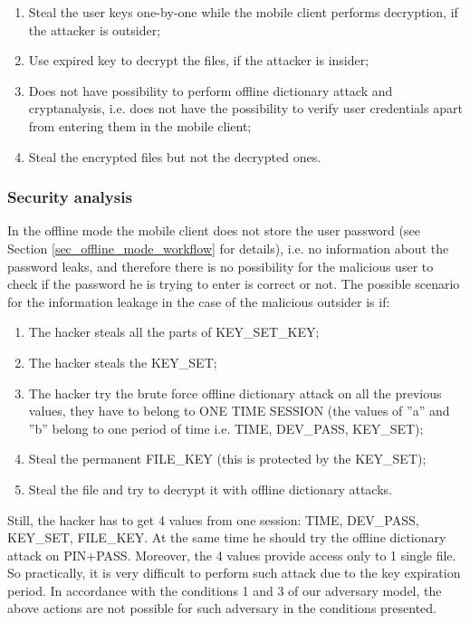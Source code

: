 \documentclass[twocolumn]{svjour3}          	%
\begin{document}
\begin{enumerate}
	\item Steal the user keys one-by-one while the mobile client performs decryption, if the attacker is outsider;
	\item Use expired key to decrypt the files, if the attacker is insider;
	\item Does not have possibility to perform offline dictionary attack and cryptanalysis, i.e. does not have the possibility to verify user credentials apart from entering them in the mobile client;
	\item Steal the encrypted files but not the decrypted ones.
\end{enumerate}

\subsubsection{Security analysis}
\label{sec_sec_analysis}

In the offline mode the mobile client does not store the user password (see Section \ref{sec_offline_mode_workflow} for details), i.e. no information about the password leaks, and therefore there is no possibility for the malicious user to check if the password he is trying to enter is correct or not. The possible scenario for the information leakage in the case of the malicious outsider is if:

\begin{enumerate}[label=(\alph*)]
	\item The hacker steals all the parts of KEY\_SET\_KEY;
	\item The hacker steals the KEY\_SET;
	\item The hacker try the brute force offline dictionary attack on all the previous values, they have to belong to ONE TIME SESSION (the values of ”a” and ”b” belong to one period of time i.e. TIME, DEV\_PASS, KEY\_SET);
	\item Steal the permanent FILE\_KEY (this is protected by the KEY\_SET);
	\item Steal the file and try to decrypt it with offline dictionary attacks.
\end{enumerate}

Still, the hacker has to get 4 values from one session: TIME, DEV\_PASS, KEY\_SET, FILE\_KEY. At the same time he should try the offline dictionary attack on PIN+PASS. Moreover, the 4 values provide access only to 1 single file. So practically, it is very difficult to perform such attack due to the key expiration period. In accordance with the conditions 1 and 3 of our adversary model, the above actions are not possible for such adversary in the conditions presented.
\end{document}
